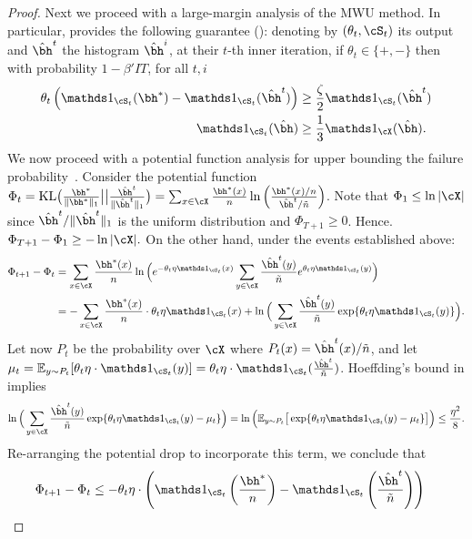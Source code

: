 \begin{proof}
Next we proceed with a large-margin analysis of the MWU method. 
In particular,  provides the following guarantee (): denoting by $(\theta_t,\cS_t)$ its output and $\hbh^t$ the histogram $\hbh^i$, at their $t$-th inner iteration, 
if $\theta_t\in\{\plus,\minus\}$ then with probability $1-\beta'IT$, for all $t,i$ 
\begin{align} 
\theta_t \left( \ind_{\cS_t}(\bh^{\ast}) - \ind_{\cS_t}(\hbh^t) \right) &\geq \frac{\zeta}{2} \ind_{\cS_t}(\hbh^t)  \label{eqn:large_margin_convergence} \\
\ind_{\cS_t}(\hbh) &\geq \frac13 \ind_{\cX}(\hbh). \label{eqn:large_weight_convergence}
\end{align}
%
We now proceed with a potential function analysis for upper bounding the failure probability~\citep[see, e.g., Chapter 7 in][]{Mohri:2018}. Consider the
potential function $\Phi_t=\mbox{KL}\big(\frac{\bh^{\ast}}{\|\bh^{\ast}\|_1}\big|\big|\frac{\hbh^t}{\|\hbh^t\|_1}\big)=\sum_{x\in \cX} \frac{\bh^{\ast}(x)}{n}\ln\Big( \frac{\bh^{\ast}(x)/n}{\hbh^t/\tilde n} \Big)$. 
Note that $\Phi_1 \le \ln |\cX|$ since $\hbh^t / \|\hbh^t\|_1$ is the uniform distribution and $\Phi_{T+1} \ge 0$. Hence. $\Phi_{T+1}-\Phi_1 \geq - \ln|\cX|.$ On the other hand, under the events established above:
\begin{align*}
\Phi_{t+1}-\Phi_t 
&= \sum_{x\in \cX} \frac{\bh^{\ast}(x)}{n}\ln\Big( e^{-\theta_t\eta \ind_{\cS_t}(x)} \sum_{y\in \cX}\frac{\hbh^t(y)}{\tilde n}e^{\theta_t\eta \ind_{\cS_t}(y)} \Big) \\
&=-\sum_{x\in \cX}\frac{\bh^{\ast}(x)}{n}\cdot\theta_t\eta\ind_{\cS_t}(x)+\ln\Big( \sum_{y\in \cX} \frac{\hbh^t(y)}{\tilde n}\exp\{\theta_t\eta\ind_{\cS_t}(y)\} \Big).
\end{align*}
Let now $P_t$ be the probability over $\cX$ where $P_t(x)=\hbh^t(x)/\tilde n$, and let $\mu_t=\mathbb{E}_{y\sim P_t}[\theta_t\eta \cdot \ind_{\cS_t}(y)]=\theta_t\eta \cdot \ind_{\cS_t}(\frac{\hbh^t}{\tilde n})$. Hoeffding's bound in \citet[Lemma B.7]{ShalevShwartz:2014} implies 
\[ \ln\Big( \sum_{y\in \cX} \frac{\hbh^t(y)}{\tilde n}\exp\{\theta_t\eta\ind_{\cS_t}(y)-\mu_t\} \Big) = \ln\Big( \mathbb{E}_{y\sim P_t} \big[\exp\{\theta_t\eta   \ind_{\cS_t}(y)-\mu_t\}\big]\Big) \leq \frac{\eta^2}{8}. \]
Re-arranging the potential drop to incorporate this term, we conclude that
\begin{align*}
\Phi_{t+1}-\Phi_t 
&\leq-\theta_t\eta \cdot \left( \ind_{\cS_t}\left(\frac{\bh^{\ast}}{n}\right) - \ind_{\cS_t}\left(\frac{\hbh^t}{\tilde n}\right) \right)

\end{align*}
\end{proof}
